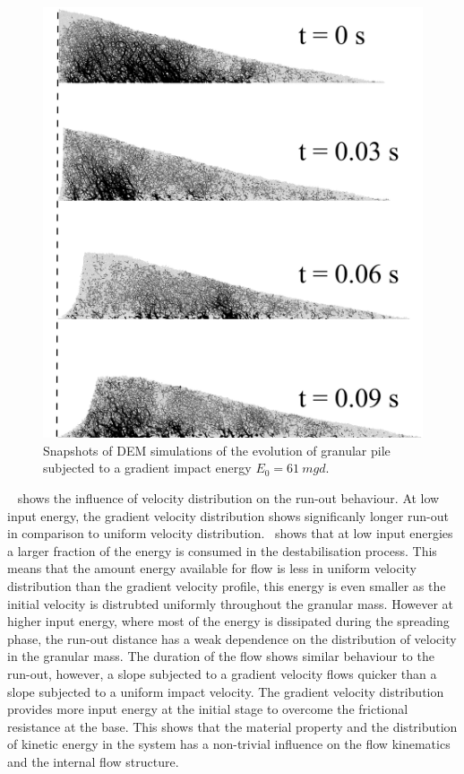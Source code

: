 \begin{figure}[tbph]
\centering
\includegraphics[width=\textwidth]{Uniform_Slope_DEM_200J}
\caption{Snapshots of DEM simulations of the evolution of granular pile 
subjected to a gradient impact energy $E_0 = 61 \ mgd$.}
\label{fig:Uniform_Slope_DEM_200J}
\end{figure}

~ shows the influence of velocity distribution on the 
run-out behaviour. At low input energy, the gradient velocity distribution 
shows significanly longer run-out in comparison to uniform velocity 
distribution.~ shows that at low input energies a larger 
fraction of the energy is consumed in the destabilisation process. This means 
that the amount energy available for flow is less in uniform velocity 
distribution than the gradient velocity profile, this energy is even smaller as 
the initial velocity is distrubted 
uniformly throughout the granular mass. However at higher input energy, where 
most of the energy is dissipated during the spreading phase, the run-out 
distance has a weak dependence on the distribution of velocity in the granular 
mass. The duration of the flow shows similar behaviour to the run-out, however, 
a slope subjected to a gradient velocity flows quicker than a slope subjected 
to a uniform impact velocity. The gradient velocity distribution provides more 
input energy at the initial stage to overcome the frictional resistance at the 
base. This shows that the material property and the distribution 
of kinetic energy in the system has a non-trivial influence on the flow 
kinematics and the internal flow structure.

